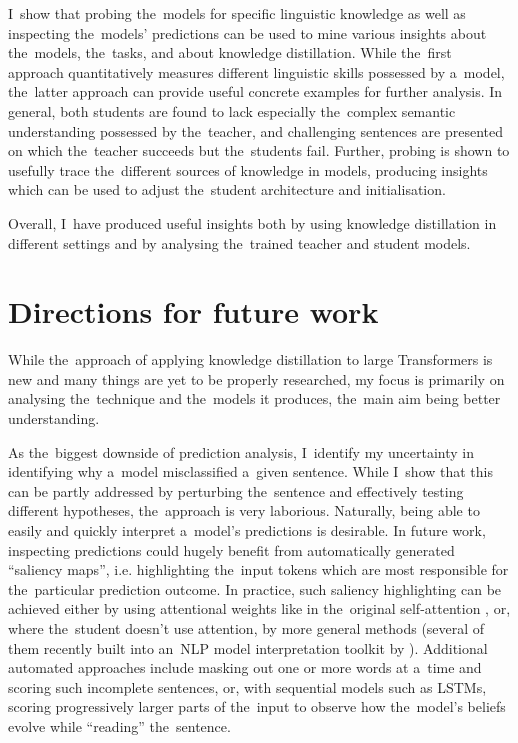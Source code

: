 \documentclass[bsc,frontabs,singlespacing,parskip,deptreport]{infthesis}
\begin{document}
{{    I~show that probing the~models for specific linguistic knowledge as well as inspecting the~models' predictions can be used to mine various insights about the~models, the~tasks, and about knowledge distillation.
    While the~first approach quantitatively measures different linguistic skills possessed by a~model, the~latter approach can provide useful concrete examples for further analysis.
    In general, both students are found to lack especially the~complex semantic understanding possessed by the~teacher, and challenging sentences are presented on which the~teacher succeeds but the~students fail.
    Further, probing is shown to usefully trace the~different sources of knowledge in models, producing insights which can be used to adjust the~student architecture and initialisation.

    Overall, I~have produced useful insights both by using knowledge distillation in different settings and by analysing the~trained teacher and student models.
  }

  \section{Directions for future work}{
    While the~approach of applying knowledge distillation to large Transformers is new and many things are yet to be properly researched, my focus is primarily on analysing the~technique and the~models it produces, the~main aim being better understanding.

    As the~biggest downside of prediction analysis, I~identify my uncertainty in identifying why a~model misclassified a~given sentence.
    While I~show that this can be partly addressed by perturbing the~sentence and effectively testing different hypotheses, the~approach is very laborious.
    Naturally, being able to easily and quickly interpret a~model's predictions is desirable.
    In future work, inspecting predictions could hugely benefit from automatically generated ``saliency maps'', i.e. highlighting the~input tokens which are most responsible for the~particular prediction outcome.
    In practice, such saliency highlighting can be achieved either by using attentional weights like in the~original self-attention \citep{Lin_2017}, or, where the~student doesn't use attention, by more general methods (several of them recently built into an~NLP model interpretation toolkit by \citet{Wallace_2019}).
    Additional automated approaches include masking out one or more words at a~time and scoring such incomplete sentences, or, with sequential models such as LSTMs, scoring progressively larger parts of the~input to observe how the~model's beliefs evolve while ``reading'' the~sentence.
    
}}
\end{document}
